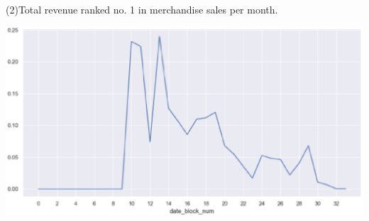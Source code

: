 (2)Total revenue ranked no. 1 in merchandise sales per month.
\begin{center}

  \begin{minipage}{0.5\linewidth}
  \centering

  \includegraphics[width=1.1\textwidth]{logos/tuone.eps}
  

  \end{minipage}
\end{center}

